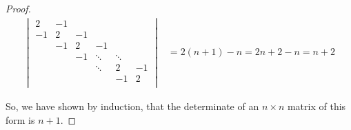 \documentclass[12pt,letterpaper]{article}
\begin{document}
\begin{enumerate}
\begin{proof}
        \begin{align*}
          \begin{vmatrix}
            2  & -1 &        &        &        &        \\
            -1 & 2  & -1     &        &        &        \\
               & -1 & 2      & -1     &        &        \\
               &    & -1     & \ddots & \ddots &        \\
               &    &        & \ddots & 2      & -1     \\
               &    &        &        & -1     & 2      \\
          \end{vmatrix}
          &= 2(n + 1) - n = 2n + 2 - n = n + 2
        \end{align*}

        So, we have shown by induction, that the determinate of an $n \times n$ matrix of this form is $n + 1$.
      \end{proof}


\end{enumerate}
\end{document}
